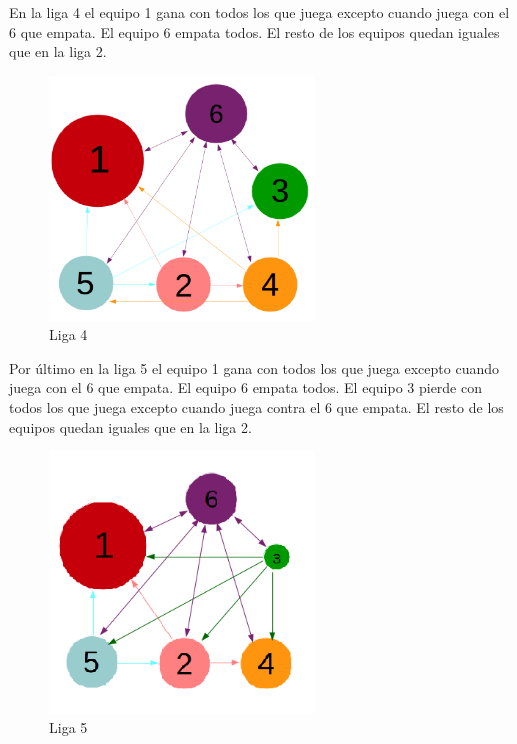             En la liga 4 el equipo 1 gana con todos los que juega excepto cuando juega con el 6 que empata. El equipo 6 empata todos. El resto de los equipos quedan iguales que en la liga 2.

                \begin{figure}[h]
                    \begin{center}
                      \includegraphics[width=7cm]{imagenes/liga4.png} \\
                      {\small Liga 4}
                    \end{center}
                \end{figure}

            Por último en la liga 5 el equipo 1 gana con todos los que juega excepto cuando juega con el 6 que empata. El equipo 6 empata todos. El equipo 3 pierde con todos los que juega excepto cuando juega contra el 6 que empata. El resto de los equipos quedan iguales que en la liga 2.

             \begin{figure}[h]
                \begin{center}
                  \includegraphics[width=7cm]{imagenes/liga5.png} \\
                  {\small Liga 5}
                \end{center}
            \end{figure}

